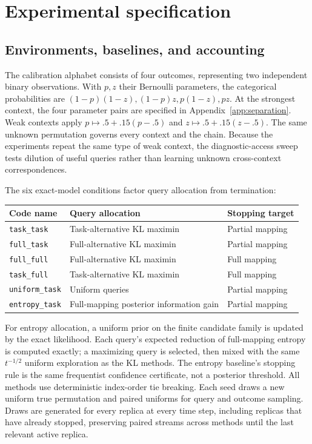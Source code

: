 \section{Experimental specification}\label{app:experiments}
\subsection{Environments, baselines, and accounting}
The calibration alphabet consists of four outcomes, representing two independent binary observations. With $p,z$ their Bernoulli parameters, the categorical probabilities are $(1-p)(1-z),(1-p)z,p(1-z),pz$. At the strongest context, the four parameter pairs are specified in Appendix~\ref{app:separation}. Weak contexts apply $p\mapsto.5+.15(p-.5)$ and $z\mapsto.5+.15(z-.5)$. The same unknown permutation governs every context and the chain. Because the experiments repeat the same type of weak context, the diagnostic-access sweep tests dilution of useful queries rather than learning unknown cross-context correspondences.

The six exact-model conditions factor query allocation from termination:
\begin{center}\small
\begin{tabular}{lll}\toprule
Code name & Query allocation & Stopping target\\\midrule
\texttt{task\_task} & Task-alternative KL maximin & Partial mapping\\
\texttt{full\_task} & Full-alternative KL maximin & Partial mapping\\
\texttt{full\_full} & Full-alternative KL maximin & Full mapping\\
\texttt{task\_full} & Task-alternative KL maximin & Full mapping\\
\texttt{uniform\_task} & Uniform queries & Partial mapping\\
\texttt{entropy\_task} & Full-mapping posterior information gain & Partial mapping\\\bottomrule
\end{tabular}
\end{center}
For entropy allocation, a uniform prior on the finite candidate family is updated by the exact likelihood. Each query's expected reduction of full-mapping entropy is computed exactly; a maximizing query is selected, then mixed with the same $t^{-1/2}$ uniform exploration as the KL methods. The entropy baseline's stopping rule is the same frequentist confidence certificate, not a posterior threshold. All methods use deterministic index-order tie breaking. Each seed draws a new uniform true permutation and paired uniforms for query and outcome sampling. Draws are generated for every replica at every time step, including replicas that have already stopped, preserving paired streams across methods until the last relevant active replica.

